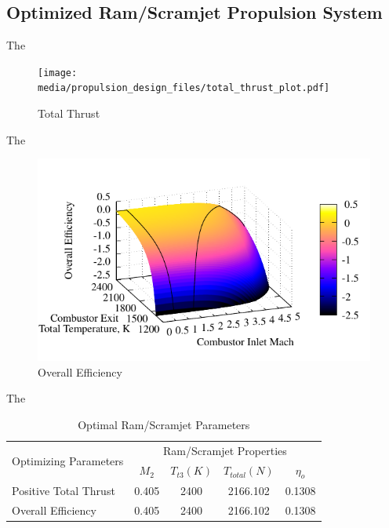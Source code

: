\documentclass[conf]{new-aiaa} %
\begin{document}
\subsection{Optimized Ram/Scramjet Propulsion System} %
The

\begin{figure}[H] %
    \centering
    \texttt{[image: media/propulsion\_design\_files/total\_thrust\_plot.pdf]}
    \caption{\label{fig:partithrust}Total Thrust}
\end{figure}
The

\begin{figure}[H] %
    \centering
    \includegraphics[]{media/propulsion_design_files/eta_o_plot.pdf}
    \caption{\label{fig:partietao}Overall Efficiency}
\end{figure}
The

\begin{table}[H] %
    \caption{\label{tab:design_propsys}Optimal Ram/Scramjet Parameters}
    \centering
    \begin{tabular}{lcccc}
        \hline
            \multirow{2}{*}{Optimizing Parameters}& \multicolumn{4}{c}{Ram/Scramjet Properties}\\
            & $M_2$& $T_{t3}(K)$& $T_{total}(N)$& $\eta_o$\\\hline
            Positive Total Thrust& 0.405& 2400& 2166.102& 0.1308\\
            Overall Efficiency& 0.405& 2400& 2166.102& 0.1308\\
        \hline
    \end{tabular}
\end{table}
\end{document}
